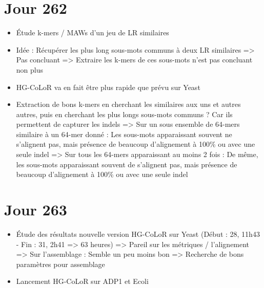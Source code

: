 \documentclass[12pt]{report}
\begin{document}
\section{Jour 262}

\begin{itemize}
	\item Étude k-mers / MAWs d'un jeu de LR similaires
	
	\item Idée : Récupérer les plus long sous-mots communs à deux LR similaires
		  => Pas concluant
		  => Extraire les k-mers de ces sous-mots n'est pas concluant non plus
		  
	\item HG-CoLoR va en fait être plus rapide que prévu sur Yeast
		  
	\item Extraction de bons k-mers en cherchant les similaires aux uns et autres autres,
		  puis en cherchant les plus longs sous-mots communs ? Car ils permettent de capturer les indels
		  => Sur un sous ensemble de 64-mers similaire à un 64-mer donné : Les sous-mots apparaissant souvent ne s'alignent pas,
		  	 mais présence de beaucoup d'alignement à 100\% ou avec une seule indel
		  => Sur tous les 64-mers apparaissant au moins 2 fois : De même, les sous-mots apparaissant souvent de s'alignent pas,
		  	 mais présence de beaucoup d'alignement à 100\% ou avec une seule indel
\end{itemize}

\section{Jour 263}

\begin{itemize}
	\item Étude des résultats nouvelle version HG-CoLoR sur Yeast (Début : 28, 11h43 - Fin : 31, 2h41 => 63 heures)
		  => Pareil sur les métriques / l'alignement
		  => Sur l'assemblage : Semble un peu moins bon
		  => Recherche de bons paramètres pour assemblage
	
	\item Lancement HG-CoLoR sur ADP1 et Ecoli
\end{itemize}
\end{document}
